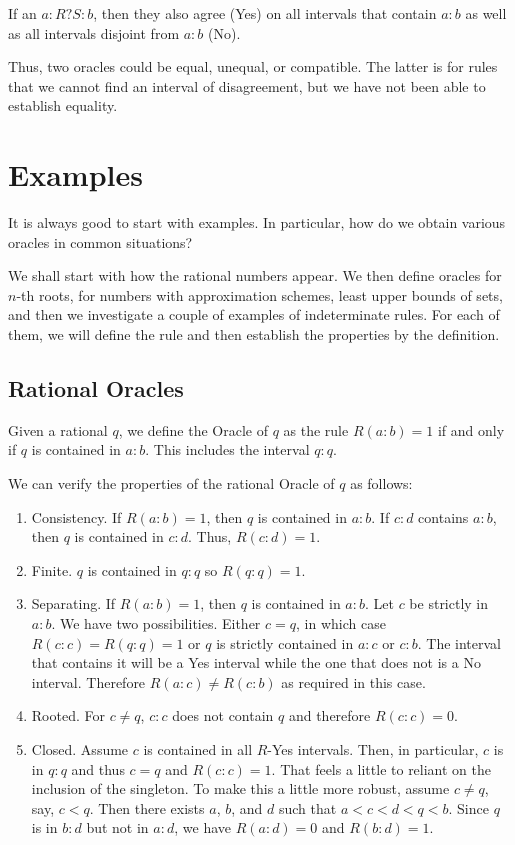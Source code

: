 \documentclass[12pt]{article}
\theoremstyle{remark}
\begin{document}
If an $a:R?S:b$, then they also agree (Yes) on all intervals that contain $a:b$ as well as all intervals disjoint from $a:b$ (No). 

Thus, two oracles could be equal, unequal, or compatible. The latter is for rules that we cannot find an interval of disagreement, but we have not been able to establish equality. 


\section{Examples}

It is always good to start with examples. In particular, how do we obtain various oracles in common situations? 

We shall start with how the rational numbers appear. We then define oracles for $n$-th roots, for numbers with approximation schemes, least upper bounds of sets, and then we investigate a couple of examples of indeterminate rules. For each of them, we will define the rule and then establish the properties by the definition. 

\subsection{Rational Oracles}

Given a rational $q$, we define the Oracle of $q$ as the rule $R(a:b) = 1$ if and only if $q$ is contained in $a:b$. This includes the interval $q:q$.  

We can verify the properties of the rational Oracle of $q$ as follows: 

\begin{enumerate}
    \item Consistency. If $R(a:b)=1$, then $q$ is contained in $a:b$. If $c:d$ contains $a:b$, then $q$ is contained in $c:d$. Thus, $R(c:d)=1$.
    \item Finite. $q$ is contained in $q:q$ so $R(q:q)=1$.
    \item Separating. If $R(a:b) =1$, then $q$ is contained in $a:b$. Let $c$ be strictly in $a:b$. We have two possibilities. Either $c = q$, in which case $R(c:c)=R(q:q)=1$ or $q$ is strictly contained in $a:c$ or $c:b$. The interval that contains it will be a Yes interval while the one that does not is a No interval. Therefore $R(a:c) \neq R(c:b)$ as required in this case. 
    \item Rooted. For $c \neq q$, $c:c$ does not contain $q$ and therefore $R(c:c)=0$.
    \item Closed. Assume $c$ is contained in all $R$-Yes intervals. Then, in particular, $c$ is in $q:q$ and thus $c=q$ and $R(c:c)=1$. That feels a little to reliant on the inclusion of the singleton. To make this a little more robust, assume $c \neq q$, say, $c < q$. Then there exists $a$, $b$, and $d$ such that $a < c < d < q < b$. Since $q$ is in $b:d$ but not in $a:d$, we have $R(a:d)=0$ and $R(b:d)=1$. 
\end{enumerate}
\end{document}
